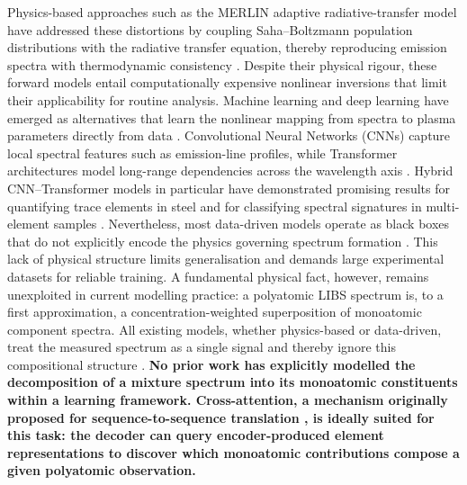 \documentclass{iopjournal}
\begin{document}
Physics-based approaches such as the MERLIN adaptive radiative-transfer model have addressed these distortions by coupling Saha--Boltzmann population distributions with the radiative transfer equation, thereby reproducing emission spectra with thermodynamic consistency \cite{favre_merlin_2025, favre_towards_2025}. Despite their physical rigour, these forward models entail computationally expensive nonlinear inversions that limit their applicability for routine analysis. Machine learning and deep learning have emerged as alternatives that learn the nonlinear mapping from spectra to plasma parameters directly from data \cite{favre_towards_2025, liu_remote_2026, wang_simulation_2024}. Convolutional Neural Networks (CNNs) capture local spectral features such as emission-line profiles, while Transformer architectures model long-range dependencies across the wavelength axis \cite{vaswani_attention_2017, liu_remote_2026}. Hybrid CNN--Transformer models in particular have demonstrated promising results for quantifying trace elements in steel \cite{liu_remote_2026} and for classifying spectral signatures in multi-element samples \cite{walidain_informer-based_2026}. Nevertheless, most data-driven models operate as black boxes that do not explicitly encode the physics governing spectrum formation \cite{hao_machine_2024}. This lack of physical structure limits generalisation and demands large experimental datasets for reliable training. A fundamental physical fact, however, remains unexploited in current modelling practice: a polyatomic LIBS spectrum is, to a first approximation, a concentration-weighted superposition of monoatomic component spectra. All existing models, whether physics-based or data-driven, treat the measured spectrum as a single signal and thereby ignore this compositional structure \cite{liu_remote_2026, favre_towards_2025}. \textbf{No prior work has explicitly modelled the decomposition of a mixture spectrum into its monoatomic constituents within a learning framework. Cross-attention, a mechanism originally proposed for sequence-to-sequence translation \cite{vaswani_attention_2017}, is ideally suited for this task: the decoder can query encoder-produced element representations to discover which monoatomic contributions compose a given polyatomic observation.}
\end{document}
